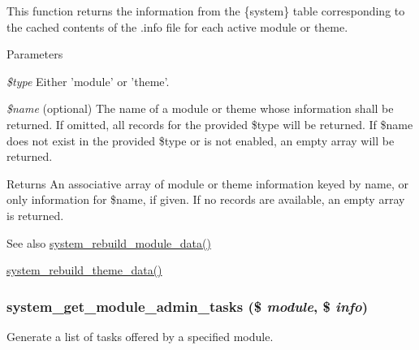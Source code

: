 This function returns the information from the \{system\} table corresponding to the cached contents of the .info file for each active module or theme.


\begin{DoxyParams}{Parameters}
\item[{\em \$type}]Either 'module' or 'theme'. \item[{\em \$name}](optional) The name of a module or theme whose information shall be returned. If omitted, all records for the provided \$type will be returned. If \$name does not exist in the provided \$type or is not enabled, an empty array will be returned.\end{DoxyParams}
\begin{DoxyReturn}{Returns}
An associative array of module or theme information keyed by name, or only information for \$name, if given. If no records are available, an empty array is returned.
\end{DoxyReturn}
\begin{DoxySeeAlso}{See also}
\hyperlink{system_8module_a2c3c848bc7c14d6f770a2f8df8f35332}{system\_\-rebuild\_\-module\_\-data()} 

\hyperlink{system_8module_a702e05f2ab6d4ac7e8be5b0e07afa701}{system\_\-rebuild\_\-theme\_\-data()} 
\end{DoxySeeAlso}
\hypertarget{system_8module_a121a9c5ed0a44d3c0adc1c60368972ab}{
\subsubsection[{system\_\-get\_\-module\_\-admin\_\-tasks}]{\setlength{\rightskip}{0pt plus 5cm}system\_\-get\_\-module\_\-admin\_\-tasks (\$ {\em module}, \/  \$ {\em info})}}
\label{system_8module_a121a9c5ed0a44d3c0adc1c60368972ab}
Generate a list of tasks offered by a specified module.


